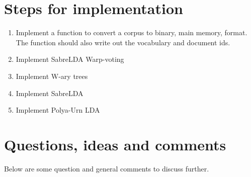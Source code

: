 \documentclass{article}
\begin{document}
\section{Steps for implementation}

\begin{enumerate}
  \item Implement a function to convert a corpus to binary, main memory, format. The function should also write out the vocabulary and document ids.
  \item Implement SabreLDA Warp-voting
  \item Implement W-ary trees
  \item Implement SabreLDA
  \item Implement Polya-Urn LDA  
\end{enumerate}


\section{Questions, ideas and comments}

Below are some question and general comments to discuss further.
\end{document}
